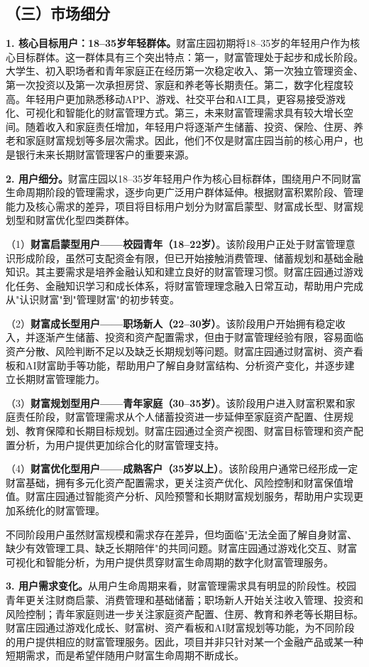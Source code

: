 \documentclass[12pt,a4paper]{ctexart}
\newcommand{\sect}[1]{\subsection*{#1}\addcontentsline{toc}{subsection}{#1}}
\newcommand{\lead}[2]{\noindent\textbf{#1}#2\par\vspace{0.6em}}
\begin{document}
\sect{（三）市场细分}
\lead{1. 核心目标用户：18--35岁年轻群体。}{财富庄园初期将18--35岁的年轻用户作为核心目标群体。这一群体具有三个突出特点：第一，财富管理处于起步和成长阶段。大学生、初入职场者和青年家庭正在经历第一次稳定收入、第一次独立管理资金、第一次投资以及第一次承担房贷、家庭和养老等长期责任。第二，数字化程度较高。年轻用户更加熟悉移动APP、游戏、社交平台和AI工具，更容易接受游戏化、可视化和智能化的财富管理方式。第三，未来财富管理需求具有较大增长空间。随着收入和家庭责任增加，年轻用户将逐渐产生储蓄、投资、保险、住房、养老和家庭财富规划等多层次需求。因此，他们不仅是财富庄园当前的核心用户，也是银行未来长期财富管理客户的重要来源。}
\lead{2. 用户细分。}{财富庄园以18--35岁年轻用户作为核心目标群体，围绕用户不同财富生命周期阶段的管理需求，逐步向更广泛用户群体延伸。根据财富积累阶段、管理能力及核心需求的差异，项目将目标用户划分为财富启蒙型、财富成长型、财富规划型和财富优化型四类群体。}
\noindent（1）\textbf{财富启蒙型用户——校园青年（18--22岁）}。该阶段用户正处于财富管理意识形成阶段，虽然可支配资金有限，但已开始接触消费管理、储蓄规划和基础金融知识。其主要需求是培养金融认知和建立良好的财富管理习惯。财富庄园通过游戏化任务、金融知识学习和成长体系，将财富管理理念融入日常互动，帮助用户完成从"认识财富"到"管理财富"的初步转变。\par\vspace{0.5em}
\noindent（2）\textbf{财富成长型用户——职场新人（22--30岁）}。该阶段用户开始拥有稳定收入，并逐渐产生储蓄、投资和资产配置需求，但由于财富管理经验有限，容易面临资产分散、风险判断不足以及缺乏长期规划等问题。财富庄园通过财富树、资产看板和AI财富助手等功能，帮助用户了解自身财富结构、分析资产变化，并逐步建立长期财富管理能力。\par\vspace{0.5em}
\noindent（3）\textbf{财富规划型用户——青年家庭（30--35岁）}。该阶段用户进入财富积累和家庭责任阶段，财富管理需求从个人储蓄投资进一步延伸至家庭资产配置、住房规划、教育保障和长期目标规划。财富庄园通过全资产视图、财富目标管理和资产配置分析，为用户提供更加综合化的财富管理支持。\par\vspace{0.5em}
\noindent（4）\textbf{财富优化型用户——成熟客户（35岁以上）}。该阶段用户通常已经形成一定财富基础，拥有多元化资产配置需求，更关注资产优化、风险控制和财富保值增值。财富庄园通过智能资产分析、风险预警和长期财富规划服务，帮助用户实现更加系统化的财富管理。\par\vspace{0.5em}
\noindent 不同阶段用户虽然财富规模和需求存在差异，但均面临"无法全面了解自身财富、缺少有效管理工具、缺乏长期陪伴"的共同问题。财富庄园通过游戏化交互、财富可视化和智能分析，为用户提供贯穿财富生命周期的数字化财富管理服务。\par\vspace{0.6em}
\lead{3. 用户需求变化。}{从用户生命周期来看，财富管理需求具有明显的阶段性。校园青年更关注财商启蒙、消费管理和基础储蓄；职场新人开始关注收入管理、投资和风险控制；青年家庭则进一步关注家庭资产配置、住房、教育和养老等长期目标。财富庄园通过游戏化成长、财富树、资产看板和AI财富规划等功能，为不同阶段的用户提供相应的财富管理服务。因此，项目并非只针对某一个金融产品或某一种短期需求，而是希望伴随用户财富生命周期不断成长。}
\end{document}
